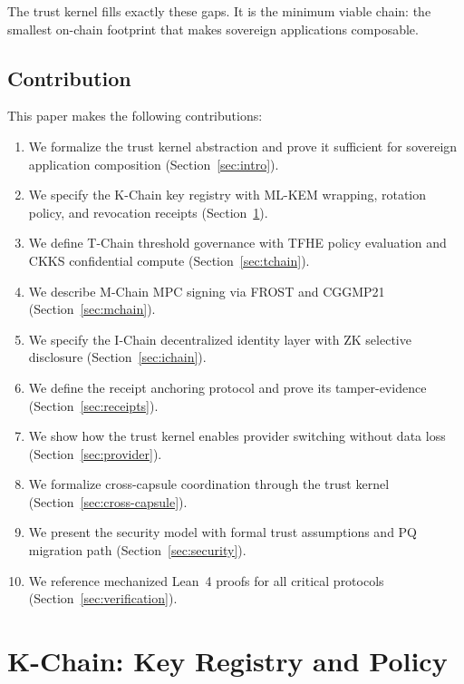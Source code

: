 \documentclass[11pt,a4paper]{article}
\begin{document}
The trust kernel fills exactly these gaps. It is the minimum viable chain: the smallest
on-chain footprint that makes sovereign applications composable.

\subsection{Contribution}

This paper makes the following contributions:

\begin{enumerate}
    \item We formalize the trust kernel abstraction and prove it sufficient for
          sovereign application composition (Section~\ref{sec:intro}).
    \item We specify the K-Chain key registry with ML-KEM wrapping, rotation
          policy, and revocation receipts (Section~\ref{sec:kchain}).
    \item We define T-Chain threshold governance with TFHE policy evaluation and
          CKKS confidential compute (Section~\ref{sec:tchain}).
    \item We describe M-Chain MPC signing via FROST and CGGMP21
          (Section~\ref{sec:mchain}).
    \item We specify the I-Chain decentralized identity layer with ZK selective
          disclosure (Section~\ref{sec:ichain}).
    \item We define the receipt anchoring protocol and prove its
          tamper-evidence (Section~\ref{sec:receipts}).
    \item We show how the trust kernel enables provider switching without data
          loss (Section~\ref{sec:provider}).
    \item We formalize cross-capsule coordination through the trust kernel
          (Section~\ref{sec:cross-capsule}).
    \item We present the security model with formal trust assumptions and PQ
          migration path (Section~\ref{sec:security}).
    \item We reference mechanized Lean~4 proofs for all critical protocols
          (Section~\ref{sec:verification}).
\end{enumerate}

\section{K-Chain: Key Registry and Policy}\label{sec:kchain}
\end{document}
